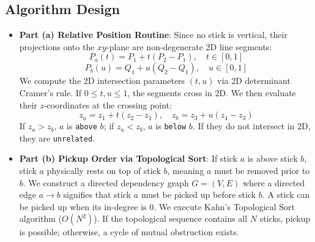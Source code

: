 \documentclass[12pt]{article}
\begin{document}
\subsection*{Algorithm Design}
\begin{itemize}
    \item \textbf{Part (a) Relative Position Routine}:
    Since no stick is vertical, their projections onto the $xy$-plane are non-degenerate 2D line segments:
    \[
    P_a(t) = P_1 + t(P_2 - P_1), \quad t \in [0, 1]
    \]
    \[
    P_b(u) = Q_1 + u(Q_2 - Q_1), \quad u \in [0, 1]
    \]
    We compute the 2D intersection parameters $(t, u)$ via 2D determinant Cramer's rule. If $0 \le t, u \le 1$, the segments cross in 2D. We then evaluate their $z$-coordinates at the crossing point:
    \[
    z_a = z_1 + t(z_2 - z_1), \quad z_b = z_3 + u(z_4 - z_3)
    \]
    If $z_a > z_b$, $a$ is \texttt{above} $b$; if $z_a < z_b$, $a$ is \texttt{below} $b$. If they do not intersect in 2D, they are \texttt{unrelated}.
    
    \item \textbf{Part (b) Pickup Order via Topological Sort}:
    If stick $a$ is above stick $b$, stick $a$ physically rests on top of stick $b$, meaning $a$ must be removed prior to $b$. We construct a directed dependency graph $G = (V, E)$ where a directed edge $a \to b$ signifies that stick $a$ must be picked up before stick $b$. A stick can be picked up when its in-degree is 0. We execute Kahn's Topological Sort algorithm ($O(N^2)$). If the topological sequence contains all $N$ sticks, pickup is possible; otherwise, a cycle of mutual obstruction exists.
\end{itemize}
\end{document}
